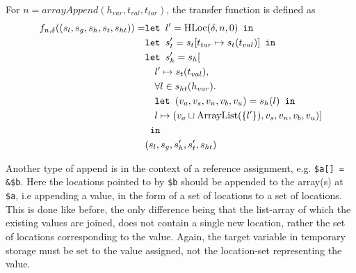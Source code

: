 For $n = \mathit{arrayAppend}(h_{var}, t_{val},t_{tar})$, the transfer function is defined as
\begin{align}
    f_{n,\delta}((s_l, s_g, s_h, s_t, s_{ht})) = &\texttt{let } l' = \text{HLoc}(\delta, n, 0) \texttt{ in } \notag\\
                              &\texttt{let } s_t' = s_t[t_{tar}\mapsto s_t(t_{val})] \texttt{ in }\notag\\
                              &\texttt{let } s_h' = s_h[\notag\\
                              &\quad l' \mapsto s_t(t_{val}), \notag\\
                              &\quad \forall l \in s_{ht}(h_{var}).\notag\\
                              &\quad\texttt{let } (v_a,v_s,v_n,v_b,v_u) = s_h(l) \texttt{ in } \notag\\
                              &\quad l\mapsto (v_a \sqcup \text{ArrayList}(\{l'\}), v_s, v_n, v_b, v_u)]\notag\\
                              & \texttt{ in }\notag\\
                              &(s_l, s_g, s_h', s_t', s_{ht})
\end{align}

Another type of append is in the context of a reference assignment, e.g. \texttt{\$a[] = \&\$b}. Here the locations pointed to by \texttt{\$b} should be appended to the array(s) at \texttt{\$a}, i.e appending a value, in the form of a set of locations to a set of locations. This is done like before, the only difference being that the list-array of which the existing values are joined, does not contain a single new location, rather the set of locations corresponding to the value. Again, the target variable in temporary storage must be set to the value assigned, not the location-set representing the value.

